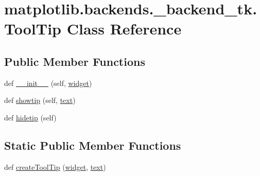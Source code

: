 \hypertarget{classmatplotlib_1_1backends_1_1__backend__tk_1_1ToolTip}{}\section{matplotlib.\+backends.\+\_\+backend\+\_\+tk.\+Tool\+Tip Class Reference}
\label{classmatplotlib_1_1backends_1_1__backend__tk_1_1ToolTip}
\subsection*{Public Member Functions}
\begin{DoxyCompactItemize}
\item 
def \hyperlink{classmatplotlib_1_1backends_1_1__backend__tk_1_1ToolTip_a9e9575eb5d34e3d023e74c30e80dc00a}{\+\_\+\+\_\+init\+\_\+\+\_\+} (self, \hyperlink{classmatplotlib_1_1backends_1_1__backend__tk_1_1ToolTip_a48ef037eca560b5c9ea6b6bcfcdb795c}{widget})
\item 
def \hyperlink{classmatplotlib_1_1backends_1_1__backend__tk_1_1ToolTip_ab18a4405850e277158ae6b5000f8c9d2}{showtip} (self, \hyperlink{classmatplotlib_1_1backends_1_1__backend__tk_1_1ToolTip_aeaeb231e46550c97265e41ce9b40e004}{text})
\item 
def \hyperlink{classmatplotlib_1_1backends_1_1__backend__tk_1_1ToolTip_ad2b724b48300276df814da1ffdb3bb69}{hidetip} (self)
\end{DoxyCompactItemize}
\subsection*{Static Public Member Functions}
\begin{DoxyCompactItemize}
\item 
def \hyperlink{classmatplotlib_1_1backends_1_1__backend__tk_1_1ToolTip_a339090fdc092a6936bc4a2b10af5e664}{create\+Tool\+Tip} (\hyperlink{classmatplotlib_1_1backends_1_1__backend__tk_1_1ToolTip_a48ef037eca560b5c9ea6b6bcfcdb795c}{widget}, \hyperlink{classmatplotlib_1_1backends_1_1__backend__tk_1_1ToolTip_aeaeb231e46550c97265e41ce9b40e004}{text})
\end{DoxyCompactItemize}
